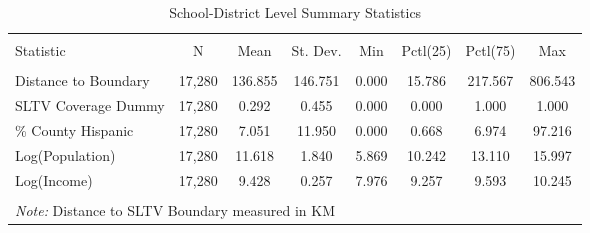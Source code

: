 
\begin{table}[!htbp] \centering 
  \caption{School-District Level Summary Statistics} 
  \label{} 
\begin{tabular}{@{\extracolsep{5pt}}lccccccc} 
\\[-1.8ex]\hline 
\hline \\[-1.8ex] 
Statistic & \multicolumn{1}{c}{N} & \multicolumn{1}{c}{Mean} & \multicolumn{1}{c}{St. Dev.} & \multicolumn{1}{c}{Min} & \multicolumn{1}{c}{Pctl(25)} & \multicolumn{1}{c}{Pctl(75)} & \multicolumn{1}{c}{Max} \\ 
\hline \\[-1.8ex] 
Distance to Boundary & 17,280 & 136.855 & 146.751 & 0.000 & 15.786 & 217.567 & 806.543 \\ 
SLTV Coverage Dummy & 17,280 & 0.292 & 0.455 & 0.000 & 0.000 & 1.000 & 1.000 \\ 
\% County Hispanic & 17,280 & 7.051 & 11.950 & 0.000 & 0.668 & 6.974 & 97.216 \\ 
Log(Population) & 17,280 & 11.618 & 1.840 & 5.869 & 10.242 & 13.110 & 15.997 \\ 
Log(Income) & 17,280 & 9.428 & 0.257 & 7.976 & 9.257 & 9.593 & 10.245 \\ 
\hline \\[-1.8ex] 
\multicolumn{8}{l}{\textit{Note:} Distance to SLTV Boundary measured in KM} \\ 
\end{tabular} 
\end{table} 
